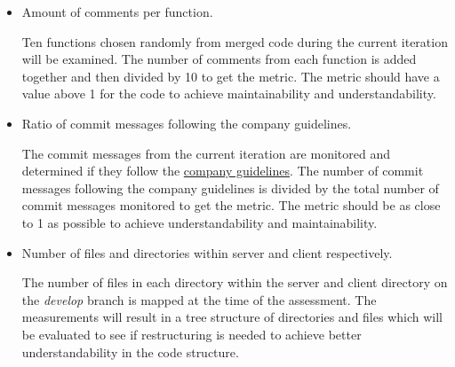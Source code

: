 \begin{itemize}

\item Amount of comments per function.

Ten functions chosen randomly from merged code during the current iteration will be examined. The number of comments from each function is added together and then divided by 10 to get the metric. The metric should have a value above 1 for the code to achieve maintainability and understandability.

\item Ratio of commit messages following the company guidelines.

The commit messages from the current iteration are monitored and determined if they follow the \href{https://gitlab.liu.se/tddc88-company-1-2021/deploy/-/tree/main#semantic-commit-messages}{company guidelines}. The number of commit messages following the company guidelines is divided by the total number of commit messages monitored to get the metric. The metric should be as close to 1 as possible to achieve understandability and maintainability.

\item Number of files and directories within server and client respectively.

The number of files in each directory within the server and client directory on the \emph{develop} branch is mapped at the time of the assessment. The measurements will result in a tree structure of directories and files which will be evaluated to see if restructuring is needed to achieve better understandability in the code structure.
\end{itemize}

